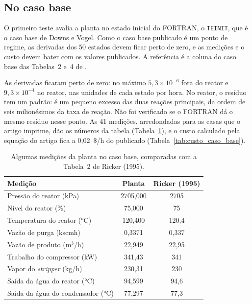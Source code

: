 \subsection{No caso base}
\label{subsec:val_caso_base}

O primeiro teste avalia a planta no estado inicial do FORTRAN, o \texttt{TEINIT}, que é o caso base de Downs e Vogel. Como o caso base publicado é um ponto de regime, as derivadas dos 50 estados devem ficar perto de zero, e as medições e o custo devem bater com os valores publicados. A referência é a coluna do caso base das Tabelas~2 e~4 de .

As derivadas ficaram perto de zero: no máximo $5{,}3\times10^{-6}$ fora do reator e $9{,}3\times10^{-4}$ no reator, nas unidades de cada estado por hora. No reator, o resíduo tem um padrão: é um pequeno excesso das duas reações principais, da ordem de seis milionésimos da taxa de reação. Não foi verificado se o FORTRAN dá o mesmo resíduo nesse ponto. As 41 medições, arredondadas para as casas que o artigo imprime, dão os números da tabela (Tabela~\ref{tab:xmeas_caso_base}), e o custo calculado pela equação do artigo fica a 0,02~\$/h do publicado (Tabela~\ref{tab:custo_caso_base}).

\begin{table}[htbp]
	\centering
	\caption{Algumas medições da planta no caso base, comparadas com a Tabela~2 de Ricker (1995).}
	\label{tab:xmeas_caso_base}
	\footnotesize
	\begin{tabular}{|l|c|c|}
		\hline
		\textbf{Medição} & \textbf{Planta} & \textbf{Ricker (1995)} \\
		\hline
		Pressão do reator (kPa) & 2705,000 & 2705 \\
		Nível do reator (\%) & 75,000 & 75 \\
		Temperatura do reator (°C) & 120,400 & 120,4 \\
		Vazão de purga (kscmh) & 0,3371 & 0,337 \\
		Vazão de produto (m$^3$/h) & 22,949 & 22,95 \\
		Trabalho do compressor (kW) & 341,43 & 341 \\
		Vapor do \textit{stripper} (kg/h) & 230,31 & 230 \\
		Saída da água do reator (°C) & 94,599 & 94,6 \\
		Saída da água do condensador (°C) & 77,297 & 77,3 \\
		\hline
	\end{tabular}
\end{table}

